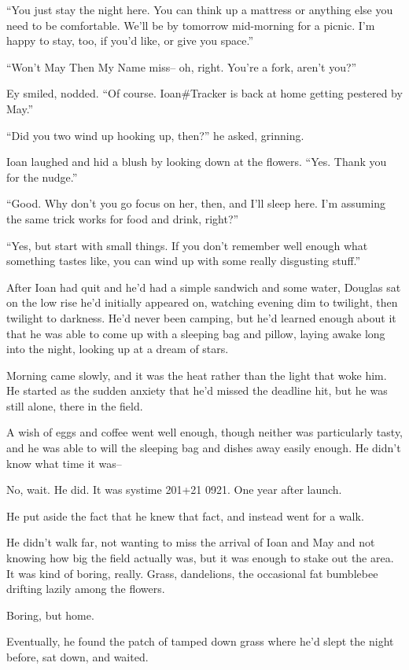 ``You just stay the night here. You can think up a mattress or anything else you need to be comfortable. We'll be by tomorrow mid-morning for a picnic. I'm happy to stay, too, if you'd like, or give you space.''

``Won't May Then My Name miss-- oh, right. You're a fork, aren't you?''

Ey smiled, nodded. ``Of course. Ioan\#Tracker is back at home getting pestered by May.''

``Did you two wind up hooking up, then?'' he asked, grinning.

Ioan laughed and hid a blush by looking down at the flowers. ``Yes. Thank you for the nudge.''

``Good. Why don't you go focus on her, then, and I'll sleep here. I'm assuming the same trick works for food and drink, right?''

``Yes, but start with small things. If you don't remember well enough what something tastes like, you can wind up with some really disgusting stuff.''

After Ioan had quit and he'd had a simple sandwich and some water, Douglas sat on the low rise he'd initially appeared on, watching evening dim to twilight, then twilight to darkness. He'd never been camping, but he'd learned enough about it that he was able to come up with a sleeping bag and pillow, laying awake long into the night, looking up at a dream of stars.

Morning came slowly, and it was the heat rather than the light that woke him. He started as the sudden anxiety that he'd missed the deadline hit, but he was still alone, there in the field.

A wish of eggs and coffee went well enough, though neither was particularly tasty, and he was able to will the sleeping bag and dishes away easily enough. He didn't know what time it was--

No, wait. He did. It was systime 201+21 0921. One year after launch.

He put aside the fact that he knew that fact, and instead went for a walk.

He didn't walk far, not wanting to miss the arrival of Ioan and May and not knowing how big the field actually was, but it was enough to stake out the area. It was kind of boring, really. Grass, dandelions, the occasional fat bumblebee drifting lazily among the flowers.

Boring, but home.

Eventually, he found the patch of tamped down grass where he'd slept the night before, sat down, and waited.

